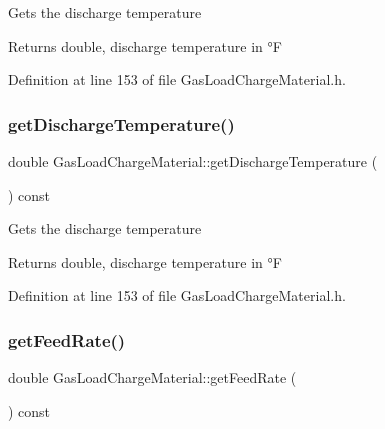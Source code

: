 Gets the discharge temperature

\begin{DoxyReturn}{Returns}
double, discharge temperature in °F 
\end{DoxyReturn}


Definition at line 153 of file Gas\+Load\+Charge\+Material.\+h.

\mbox{\label{class_gas_load_charge_material_a6baaf6ad65e2a3d1fa90b7c007bc3c53}} 
\subsubsection{\texorpdfstring{get\+Discharge\+Temperature()}{getDischargeTemperature()}\hspace{0.1cm}{\footnotesize\ttfamily [3/3]}}
{\footnotesize\ttfamily double Gas\+Load\+Charge\+Material\+::get\+Discharge\+Temperature (\begin{DoxyParamCaption}{ }\end{DoxyParamCaption}) const\hspace{0.3cm}{\ttfamily [inline]}}

Gets the discharge temperature

\begin{DoxyReturn}{Returns}
double, discharge temperature in °F 
\end{DoxyReturn}


Definition at line 153 of file Gas\+Load\+Charge\+Material.\+h.

\mbox{\label{class_gas_load_charge_material_ae14ebe9b7091a491166174968505b6ee}} 
\subsubsection{\texorpdfstring{get\+Feed\+Rate()}{getFeedRate()}\hspace{0.1cm}{\footnotesize\ttfamily [1/3]}}
{\footnotesize\ttfamily double Gas\+Load\+Charge\+Material\+::get\+Feed\+Rate (\begin{DoxyParamCaption}{ }\end{DoxyParamCaption}) const\hspace{0.3cm}{\ttfamily [inline]}}

